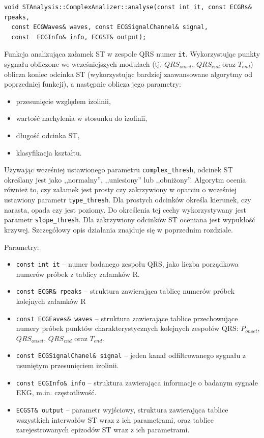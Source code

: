 \documentclass[a4paper, 11pt]{article}
\begin{document}
\begin{lstlisting}
void STAnalysis::ComplexAnalizer::analyse(const int it, const ECGRs& rpeaks,
  const ECGWaves& waves, const ECGSignalChannel& signal,
  const  ECGInfo& info, ECGST& output);
\end{lstlisting}

Funkcja analizująca załamek ST w zespole QRS numer \verb|it|. Wykorzystując
punkty sygnału obliczone we wcześniejszych modułach (tj. $QRS_{onset}$,
$QRS_{end}$ oraz $T_{end}$) oblicza koniec odcinka ST (wykorzystując bardziej
zaawansowane algorytmy od poprzedniej funkcji), a następnie oblicza jego parametry:
\begin{itemize}
  \item przesunięcie względem izolinii,
  \item wartość nachylenia w stosunku do izolinii,
  \item długość odcinka ST,
  \item klasyfikacja kształtu.
\end{itemize}
Używając wcześniej ustawionego parametru \verb|complex_thresh|, odcinek ST
określany jest jako ,,normalny'', ,,uniesiony'' lub ,,obniżony''. Algorytm
ocenia również to, czy załamek jest prosty czy zakrzywiony w oparciu o
wcześniej ustawiony parametr \verb|type_thresh|. Dla prostych odcinków określa
kierunek, czy narasta, opada czy jest poziomy. Do określenia tej cechy
wykorzystywany jest parametr \verb|slope_thresh|. Dla zakrzywiony odcinków ST
oceniana jest wypukłość krzywej. Szczegółowy opis działania znajduje się w
poprzednim rozdziale.

Parametry:
\begin{itemize}
  \item \verb|const int it| -- numer badanego zespołu QRS, jako liczba
    porządkowa numerów próbek z tablicy załamków R.
  \item \verb|const ECGR& rpeaks| -- struktura zawierająca tablicę numerów
    próbek kolejnych załamków R
  \item \verb|const ECGEaves& waves| -- struktura zawierające tablice
    przechowujące numery próbek punktów charakterystycznych kolejnych zespołów
    QRS: $P_{onset}$, $QRS_{onset}$, $QRS_{end}$ oraz $T_{end}$.
  \item \verb|const ECGSignalChanel& signal| -- jeden kanał odfiltrowanego
    sygnału z usuniętym przesunięciem izolinii.
  \item \verb|const ECGInfo& info| -- struktura zawierająca informacje o badanym
    sygnale EKG, m.in. częstotliwość.
  \item \verb|ECGST& output| -- parametr wyjściowy, struktura zawierająca
    tablice wszystkich interwałów ST wraz z ich parametrami, oraz tablice
    zarejestrowanych epizodów ST wraz z ich parametrami.
\end{itemize}
\end{document}

